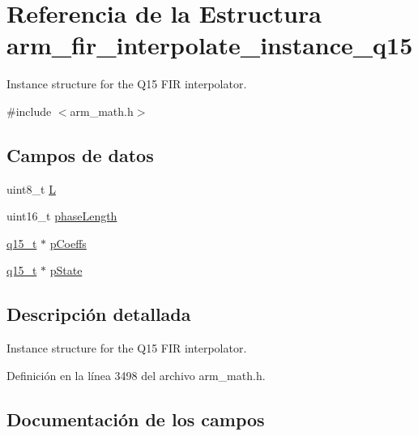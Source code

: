 \hypertarget{structarm__fir__interpolate__instance__q15}{}\section{Referencia de la Estructura arm\+\_\+fir\+\_\+interpolate\+\_\+instance\+\_\+q15}
\label{structarm__fir__interpolate__instance__q15}


Instance structure for the Q15 F\+IR interpolator.  




{\ttfamily \#include $<$arm\+\_\+math.\+h$>$}

\subsection*{Campos de datos}
\begin{DoxyCompactItemize}
\item 
uint8\+\_\+t \hyperlink{structarm__fir__interpolate__instance__q15_aee73cc056696e504430c53eaa9c58cf0}{L}
\item 
uint16\+\_\+t \hyperlink{structarm__fir__interpolate__instance__q15_a8f92bb07e0812f94679438cdf412b26a}{phase\+Length}
\item 
\hyperlink{arm__math_8h_ab5a8fb21a5b3b983d5f54f31614052ea}{q15\+\_\+t} $\ast$ \hyperlink{structarm__fir__interpolate__instance__q15_a7ca181a37f714d174445f486bebce26f}{p\+Coeffs}
\item 
\hyperlink{arm__math_8h_ab5a8fb21a5b3b983d5f54f31614052ea}{q15\+\_\+t} $\ast$ \hyperlink{structarm__fir__interpolate__instance__q15_ae29dfdb736374fcddaeaec4b7770170c}{p\+State}
\end{DoxyCompactItemize}


\subsection{Descripción detallada}
Instance structure for the Q15 F\+IR interpolator. 

Definición en la línea 3498 del archivo arm\+\_\+math.\+h.



\subsection{Documentación de los campos}
